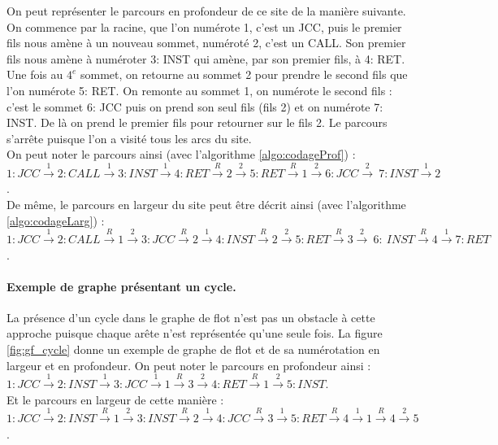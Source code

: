 On peut représenter le parcours en profondeur de ce site de la manière suivante. On commence par la racine, que l'on numérote 1, c'est un JCC, puis le premier fils nous amène à un nouveau sommet, numéroté 2, c'est un CALL. Son premier fils nous amène à numéroter 3: INST qui amène, par son premier fils, à 4: RET. Une fois au $4^e$ sommet, on retourne au sommet 2 pour prendre le second fils que l'on numérote 5: RET. On remonte au sommet 1, on numérote le second fils : c'est le sommet 6: JCC puis on prend son seul fils (fils 2) et on numérote 7: INST. De là on prend le premier fils pour retourner sur le fils 2. Le parcours s'arrête puisque l'on a visité tous les arcs du site.\\
On peut noter le parcours ainsi (avec l'algorithme \ref{algo:codageProf}) :\\
$1: JCC\xrightarrow{1} 2: CALL \xrightarrow{1} 3: INST \xrightarrow{1} 4: RET \xrightarrow{R} 2 \xrightarrow{2} 5: RET \xrightarrow{R} 1 \xrightarrow{2} 6: JCC \xrightarrow{2}~7:INST \xrightarrow{1} 2$.\\
De même, le parcours en largeur du site peut être décrit ainsi (avec l'algorithme \ref{algo:codageLarg}) :\\
$1: JCC\xrightarrow{1} 2: CALL\xrightarrow{R} 1\xrightarrow{2} 3: JCC\xrightarrow{R} 2\xrightarrow{1} 4: INST\xrightarrow{R} 2\xrightarrow{2} 5: RET \xrightarrow{R} 3 \xrightarrow{2}~6:~INST \xrightarrow{R} 4\xrightarrow{1} 7: RET$.\\

\paragraph{Exemple de graphe présentant un cycle.}
La présence d'un cycle dans le graphe de flot n'est pas un obstacle à cette approche puisque chaque arête n'est représentée qu'une seule fois.
La figure \ref{fig:gf_cycle} donne un exemple de graphe de flot et de sa numérotation en largeur et en profondeur.
On peut noter le parcours en profondeur ainsi :\\
$1: JCC\xrightarrow{1} 2: INST \xrightarrow{1} 3: JCC \xrightarrow{1} 1 \xrightarrow{R} 3 \xrightarrow{2} 4: RET \xrightarrow{R} 1 \xrightarrow{2} 5: INST$.\\
Et le parcours en largeur de cette manière :\\
$1: JCC\xrightarrow{1} 2: INST\xrightarrow{R} 1\xrightarrow{2} 3: INST\xrightarrow{R} 2\xrightarrow{1} 4: JCC\xrightarrow{R} 3\xrightarrow{1} 5: RET\xrightarrow{R} 4\xrightarrow{1} 1\xrightarrow{R} 4\xrightarrow{2} 5$.\\

